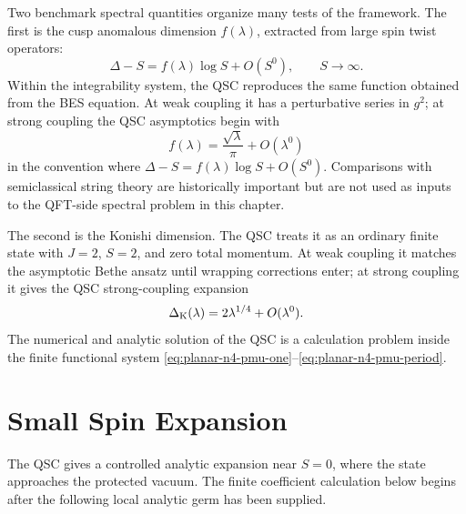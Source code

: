 Two benchmark spectral quantities organize many tests of the framework.  The
first is the cusp anomalous dimension \(f(\lambda)\), extracted from large
spin twist operators:
\[
  \Delta-S
  =
  f(\lambda)\log S+O(S^0),
  \qquad S\to\infty.
\]
Within the integrability system, the QSC reproduces the same function obtained
from the BES equation.  At weak coupling it has a perturbative series in
\(g^2\); at strong coupling the QSC asymptotics begin with
\[
  f(\lambda)=\frac{\sqrt\lambda}{\pi}+O(\lambda^0)
\]
in the convention where \(\Delta-S=f(\lambda)\log S+O(S^0)\).  Comparisons
with semiclassical string theory are historically important but are not used
as inputs to the QFT-side spectral problem in this chapter.

The second is the Konishi dimension.  The QSC treats it as an ordinary finite
state with \(J=2\), \(S=2\), and zero total momentum.  At weak coupling it
matches the asymptotic Bethe ansatz until wrapping corrections enter; at
strong coupling it gives the QSC strong-coupling expansion
\[
  \Delta_{\rm K}(\lambda)
  =
  2\lambda^{1/4}
  +O(\lambda^0).
\]
The numerical and analytic solution of the QSC is a calculation problem
inside the finite functional system \eqref{eq:planar-n4-pmu-one}--\eqref{eq:planar-n4-pmu-period}.

\section{Small Spin Expansion}

The QSC gives a controlled analytic expansion near \(S=0\), where the state
approaches the protected vacuum.  The finite coefficient calculation below
begins after the following local analytic germ has been supplied.

